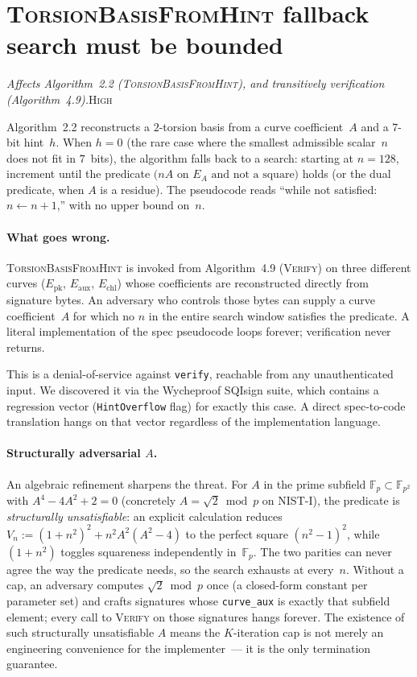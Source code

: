 \documentclass[a4paper,11pt]{article}
\newcommand{\algo}[1]{Algorithm~#1}
\newcommand{\Fp}{\mathbb{F}_p}
\newcommand{\Fpii}{\mathbb{F}_{p^2}}
\newcommand{\high}{\textsc{\color{BurntOrange}High}}
\newcommand{\finding}[2]{\noindent\textit{#1}\hfill#2\par\smallskip}
\begin{document}
\section{\textsc{TorsionBasisFromHint} fallback search must be bounded}
\label{sec:spec-find-uv-cap}

\finding{Affects \algo{2.2} (\textsc{TorsionBasisFromHint}), and
transitively verification (\algo{4.9}).}{\high}

\algo{2.2} reconstructs a $2$-torsion basis from a curve
coefficient~$A$ and a $7$-bit hint~$h$.  When $h = 0$ (the rare case
where the smallest admissible scalar~$n$ does not fit in $7$~bits),
the algorithm falls back to a search: starting at $n = 128$, increment
until the predicate $\bigl(n A \text{ on } E_A \text{ and not a square}\bigr)$
holds (or the dual predicate, when $A$ is a residue).  The
pseudocode reads ``while not satisfied: $n \leftarrow n + 1$,''
with no upper bound on~$n$.

\paragraph{What goes wrong.}
\textsc{TorsionBasisFromHint} is invoked from \algo{4.9}
(\textsc{Verify}) on three different curves
($E_{\mathrm{pk}}$, $E_{\mathrm{aux}}$, $E_{\mathrm{chl}}$) whose
coefficients are reconstructed directly from signature bytes.  An
adversary who controls those bytes can supply a curve coefficient~$A$
for which no $n$ in the entire search window satisfies the
predicate.  A literal implementation of the spec pseudocode loops
forever; verification never returns.

This is a denial-of-service against \texttt{verify}, reachable from
any unauthenticated input.  We discovered it via the Wycheproof
SQIsign suite, which contains a regression vector
(\texttt{HintOverflow} flag) for exactly this case.  A direct
spec-to-code translation hangs on that vector regardless of the
implementation language.

\paragraph{Structurally adversarial $A$.}
An algebraic refinement sharpens the threat.  For $A$ in the
prime subfield $\Fp \subset \Fpii$ with $A^4 - 4 A^2 + 2 = 0$
(concretely $A = \sqrt{2} \bmod p$ on NIST-I), the predicate is
\emph{structurally unsatisfiable}: an explicit calculation reduces
$V_n := (1+n^2)^2 + n^2 A^2 (A^2 - 4)$ to the perfect square
$(n^2 - 1)^2$, while $(1+n^2)$ toggles squareness independently
in~$\Fp$.  The two parities can never agree the way the predicate
needs, so the search exhausts at every~$n$.  Without a cap, an
adversary computes $\sqrt{2} \bmod p$ once (a closed-form constant
per parameter set) and crafts signatures whose
\texttt{curve\_aux} is exactly that subfield element; every call
to \textsc{Verify} on those signatures hangs forever.  The
existence of such structurally unsatisfiable $A$ means the
$K$-iteration cap is not merely an engineering convenience for
the implementer~--- it is the only termination guarantee.
\end{document}
